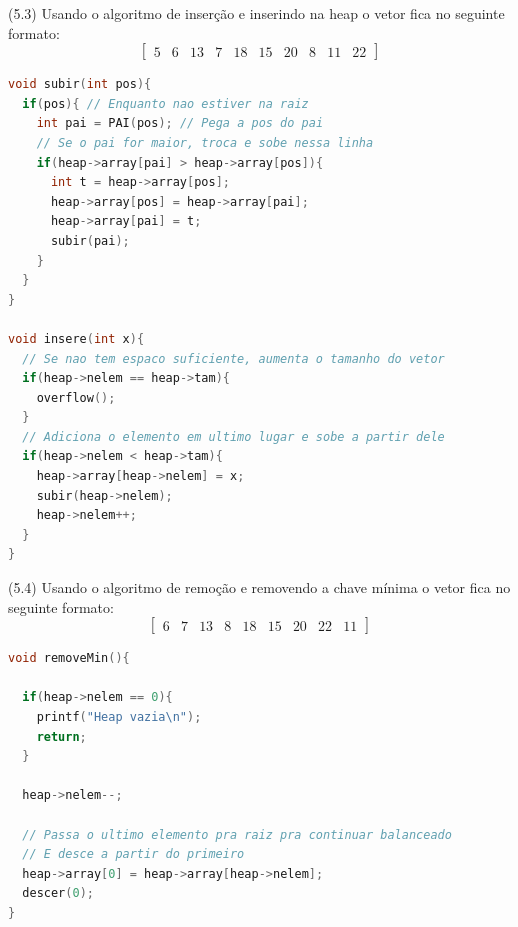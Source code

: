 \documentclass{homework}
\begin{document}
\newpage
(5.3) Usando o algoritmo de inserção e inserindo na heap o vetor fica no seguinte formato:
\[
\begin{bmatrix}
5 & 6 & 13 & 7 & 18 & 15 & 20 & 8 & 11 & 22
\end{bmatrix}
\]
\begin{lstlisting}[language=C]
void subir(int pos){
  if(pos){ // Enquanto nao estiver na raiz
    int pai = PAI(pos); // Pega a pos do pai
    // Se o pai for maior, troca e sobe nessa linha
    if(heap->array[pai] > heap->array[pos]){ 
      int t = heap->array[pos];
      heap->array[pos] = heap->array[pai];
      heap->array[pai] = t;
      subir(pai);
    }
  }
}

void insere(int x){
  // Se nao tem espaco suficiente, aumenta o tamanho do vetor
  if(heap->nelem == heap->tam){
    overflow();
  }
  // Adiciona o elemento em ultimo lugar e sobe a partir dele
  if(heap->nelem < heap->tam){
    heap->array[heap->nelem] = x;
    subir(heap->nelem);
    heap->nelem++;
  }
}
\end{lstlisting}
\newpage

(5.4) Usando o algoritmo de remoção e removendo a chave mínima o vetor fica no seguinte formato:
\[
\begin{bmatrix}
6 & 7 & 13 & 8 & 18 & 15 & 20 & 22 & 11
\end{bmatrix}
\]
\begin{lstlisting}[language=C]
void removeMin(){

  if(heap->nelem == 0){
    printf("Heap vazia\n");
    return;
  }
  
  heap->nelem--;
  
  // Passa o ultimo elemento pra raiz pra continuar balanceado
  // E desce a partir do primeiro
  heap->array[0] = heap->array[heap->nelem];
  descer(0);
}
\end{lstlisting}
\end{document}
